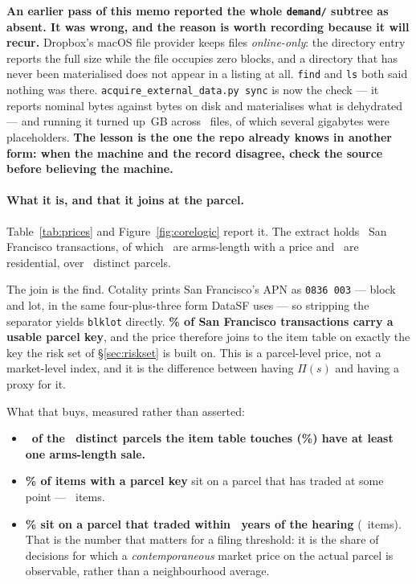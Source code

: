 \documentclass[11pt]{article}
\begin{document}
\textbf{An earlier pass of this memo reported the whole \texttt{demand/} subtree as absent.
It was wrong, and the reason is worth recording because it will recur.} Dropbox's macOS file
provider keeps files \emph{online-only}: the directory entry reports the full size while the
file occupies zero blocks, and a directory that has never been materialised does not appear in
a listing at all. \texttt{find} and \texttt{ls} both said nothing was there.
\texttt{acquire\_external\_data.py sync} is now the check --- it reports nominal bytes
against bytes on disk and materialises what is dehydrated --- and running it turned up
\acqDemandGB\,GB across \acqDemandFiles\ files, of which several gigabytes were
placeholders. \textbf{The lesson is the one the repo already knows in another form: when the
machine and the record disagree, check the source before believing the machine.}

\paragraph{What it is, and that it joins at the parcel.} Table~\ref{tab:prices} and
Figure~\ref{fig:corelogic} report it. The extract holds \acqClRows\ San Francisco
transactions, of which \acqClPriced\ are arms-length with a price and \acqClResidential\
are residential, over \acqClParcels\ distinct parcels.

The join is the find. Cotality prints San Francisco's APN as \texttt{0836 003} --- block and
lot, in the same four-plus-three form DataSF uses --- so stripping the separator yields
\texttt{blklot} directly. \textbf{\acqClKeyed\% of San Francisco transactions carry a
usable parcel key}, and the price therefore joins to the item table on exactly the key the
risk set of \S\ref{sec:riskset} is built on. This is a parcel-level price, not a
market-level index, and it is the difference between having $\Pi(s)$ and having a proxy
for it.

What that buys, measured rather than asserted:

\begin{itemize}
\item \textbf{\acqClItemKeysTraded\ of the \acqClItemKeys\ distinct parcels the item
table touches (\acqClItemKeysTradedPct\%) have at least one arms-length sale.}
\item \textbf{\acqClItemsEverPct\% of items with a parcel key} sit on a parcel that has
traded at some point --- \acqClItemsEver\ items.
\item \textbf{\acqClItemsNearPct\% sit on a parcel that traded within
\acqClWindowYears\ years of the hearing} (\acqClItemsNear\ items). That is the number
that matters for a filing threshold: it is the share of decisions for which a
\emph{contemporaneous} market price on the actual parcel is observable, rather than a
neighbourhood average.
\end{itemize}
\end{document}
